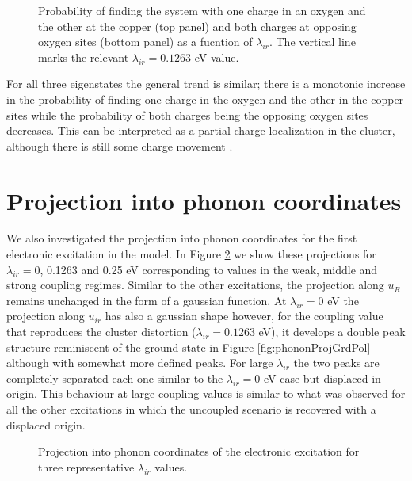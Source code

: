 \begin{figure}[ht]
  \centering
  
  \caption[Probability of finding the system with one charge in an oxygen and the other at the copper and both charges at opposing oxygen sites.]
  {Probability of finding the system with one charge in an oxygen and the other at the copper (top panel) and both charges at opposing oxygen sites (bottom panel) as a fucntion of $\lambda_{ir}$.
  The vertical line marks the relevant $\lambda_{ir}=0.1263$ eV value.}
  \label{fig:electronicOccupations}
\end{figure}

For all three eigenstates the general trend is similar; there is a monotonic increase in the probability of finding one charge in the oxygen and the other in the copper sites while the probability of both charges being the opposing oxygen sites decreases.
This can be interpreted as a partial charge localization in the cluster, although there is still some charge movement \cite{GarciaSaraviaOrtizdeMontellano2013}.

\section{Projection into phonon coordinates}
\label{sec:elPhononProj}

We also investigated the projection into phonon coordinates for the first electronic excitation in the model.
In Figure \ref{fig:phononProjElectr} we show these projections for $\lambda_{ir}=$0, 0.1263 and 0.25 eV corresponding to values in the weak, middle and strong coupling regimes.
Similar to the other excitations, the projection along $u_R$ remains unchanged in the form of a gaussian function.
At $\lambda_{ir}=0$ eV the projection along $u_{ir}$ has also a gaussian shape however, for the coupling value that reproduces the cluster distortion ($\lambda_{ir}=0.1263$ eV), it develops a double peak structure reminiscent of the ground state in Figure \ref{fig:phononProjGrdPol} although with somewhat more defined peaks.
For large $\lambda_{ir}$ the two peaks are completely separated each one similar to the $\lambda_{ir}=0$ eV case but displaced in origin.
This behaviour at large coupling values is similar to what was observed for all the other excitations in which the uncoupled scenario is recovered with a displaced origin.

\begin{figure}[ht]
  \centering
  
  \caption[Projection into phonon coordinates of the electronic excitation.]
  {Projection into phonon coordinates of the electronic excitation for three representative $\lambda_{ir}$ values.}
  \label{fig:phononProjElectr}
\end{figure}

